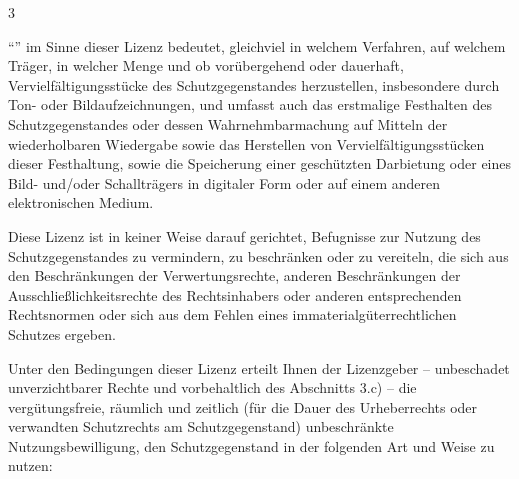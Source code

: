 \begin{WidePar}
\begin{multicols}{3}
\begin{description}
  \enquote{} im Sinne dieser Lizenz
  bedeutet, gleichviel in welchem Verfahren, auf welchem
  Träger, in welcher Menge und ob vorübergehend oder
  dauerhaft, Vervielfältigungsstücke des
  Schutzgegenstandes herzustellen, insbesondere durch Ton-
  oder Bildaufzeichnungen, und umfasst auch das erstmalige
  Festhalten des Schutzgegenstandes oder dessen
  Wahrnehmbarmachung auf Mitteln der wiederholbaren
  Wiedergabe sowie das Herstellen von
  Vervielfältigungsstücken dieser Festhaltung, sowie die
  Speicherung einer geschützten Darbietung oder eines
  Bild- und/oder Schallträgers in digitaler Form oder auf
  einem anderen elektronischen Medium.
  
  \item[2. Beschränkungen der Verwertungsrechte]
  Diese Lizenz ist in keiner Weise darauf gerichtet,
  Befugnisse zur Nutzung des Schutzgegenstandes zu vermindern,
  zu beschränken oder zu vereiteln, die sich aus den
  Beschränkungen der Verwertungsrechte, anderen Beschränkungen
  der Ausschließlichkeitsrechte des Rechtsinhabers oder
  anderen entsprechenden Rechtsnormen oder sich aus dem Fehlen
  eines immaterialgüterrechtlichen Schutzes ergeben.
  
  \item[3. Lizenzierung]
  Unter den Bedingungen dieser Lizenz erteilt Ihnen der
  Lizenzgeber -- unbeschadet unverzichtbarer Rechte und
  vorbehaltlich des Abschnitts 3.c) -- die vergütungsfreie,
  räumlich und zeitlich (für die Dauer des Urheberrechts oder
  verwandten Schutzrechts am Schutzgegenstand) unbeschränkte
  Nutzungsbewilligung, den Schutzgegenstand in der folgenden
  Art und Weise zu nutzen:
  

\end{description}
\end{multicols}
\end{WidePar}
